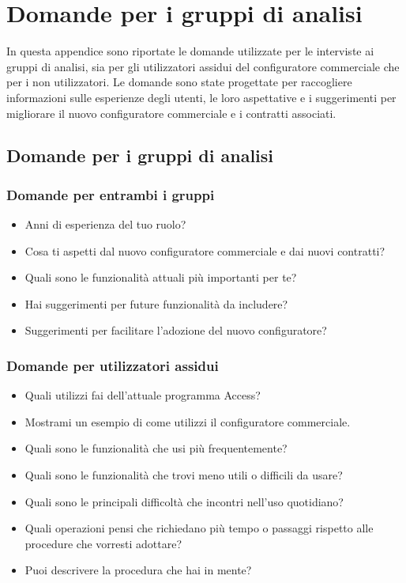 \chapter{Domande per i gruppi di analisi}\label{app:domande}
In questa appendice sono riportate le domande utilizzate per le interviste ai gruppi di analisi,
 sia per gli utilizzatori assidui del configuratore commerciale che per i non utilizzatori.
  Le domande sono state progettate per raccogliere informazioni sulle esperienze degli utenti,
   le loro aspettative e i suggerimenti per migliorare il nuovo configuratore commerciale e i contratti associati.
\section{Domande per i gruppi di analisi}
\subsection{Domande per entrambi i gruppi}
\begin{itemize}
    \item Anni di esperienza del tuo ruolo?
    \item Cosa ti aspetti dal nuovo configuratore commerciale e dai nuovi contratti?
    \item Quali sono le funzionalità attuali più importanti per te?
    \item Hai suggerimenti per future funzionalità da includere?
    \item Suggerimenti per facilitare l'adozione del nuovo configuratore?
\end{itemize}

\subsection{Domande per utilizzatori assidui}
\begin{itemize}
    \item Quali utilizzi fai dell'attuale programma Access?
    \item Mostrami un esempio di come utilizzi il configuratore commerciale.
    \item Quali sono le funzionalità che usi più frequentemente?
    \item Quali sono le funzionalità che trovi meno utili o difficili da usare?
    \item Quali sono le principali difficoltà che incontri nell'uso quotidiano?
    \item Quali operazioni pensi che richiedano più tempo o passaggi rispetto alle
          procedure che vorresti adottare?
    \item Puoi descrivere la procedura che hai in mente?
\end{itemize}

